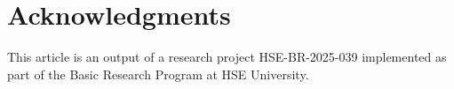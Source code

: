 \documentclass[numbers,webpdf,imaiai]{ima-authoring-template}%
\theoremstyle{thmstyletwo}%
\numberwithin{equation}{section}
\begin{document}
\section*{Acknowledgments}
This article is an output of a research project HSE-BR-2025-039 implemented as part of the Basic Research Program at HSE University.


%
%






%
%
\end{document}
